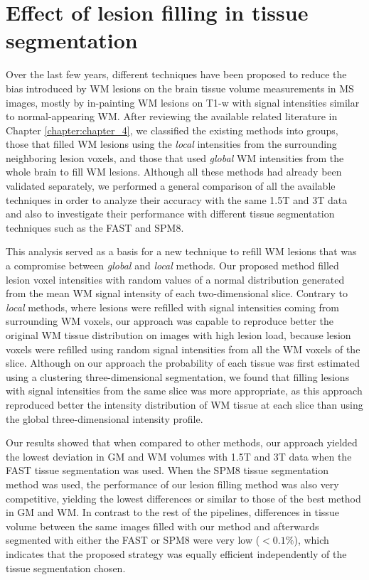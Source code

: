 \section{Effect of lesion filling in tissue segmentation}

Over the last few years, different techniques have been proposed to reduce the bias introduced by WM lesions on the brain tissue volume measurements in MS images, mostly by in-painting WM lesions on T1-w with signal intensities similar to normal-appearing WM.  After reviewing the  available related literature in Chapter \ref{chapter:chapter_4}, we classified the existing methods into groups, those that filled WM lesions using the \textit{local} intensities from the surrounding neighboring lesion voxels, and those that used \textit{global} WM intensities from the whole brain to fill WM lesions. Although all these methods had already been validated separately, we performed a general comparison of all the available techniques in order to analyze their accuracy with the same 1.5T and 3T data and also to investigate their performance with different tissue segmentation techniques such as the FAST and SPM8.

This analysis served as a basis for a new technique to refill WM lesions that was a compromise between \textit{global} and \textit{local} methods. Our proposed method filled lesion voxel intensities with random values of a normal distribution generated from the mean WM signal intensity of each two-dimensional slice. Contrary to \textit{local} methods, where lesions were refilled with signal intensities coming from surrounding WM voxels, our approach was capable to reproduce better the original WM tissue distribution on images with high lesion load, because lesion voxels were refilled using random signal intensities from all the WM voxels of the slice. Although on our approach the probability of each tissue was first estimated using a clustering three-dimensional segmentation, we found that filling lesions with signal intensities from the same slice was more appropriate, as this approach reproduced better the intensity distribution of WM tissue at each slice than using the global three-dimensional intensity profile.

Our results showed that when compared to other methods, our approach yielded the lowest deviation in GM and WM volumes with 1.5T and 3T data when the FAST tissue segmentation was used. When the SPM8 tissue segmentation method was used, the performance of our lesion filling method was also very competitive, yielding the lowest differences or similar to those of the best method in GM and WM. In contrast to the rest of the pipelines, differences in tissue volume between the same images filled with our method and afterwards segmented with either the FAST or SPM8 were very low ($<0.1\%$), which indicates that the proposed strategy was equally efficient independently of the tissue segmentation chosen.

